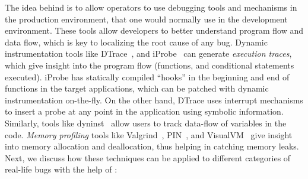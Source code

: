 The idea behind \parikshan is to allow operators to use debugging tools and mechanisms in the production environment, that one would normally use in the development environment.
These tools allow developers to better understand program flow and data flow, which is key to localizing the root cause of any bug.
Dynamic instrumentation tools like DTrace~\cite{dtrace}, and iProbe~\cite{iProbe} can generate \emph{execution traces}, which give insight into the program flow (functions, and conditional statements executed).
iProbe has statically compiled ``hooks'' in the beginning and end of functions in the target applications, which can be patched with dynamic instrumentation on-the-fly.
On the other hand, DTrace uses interrupt mechanisms to insert a probe at any point in the application using symbolic information. 
Similarly, tools like dyninst~\cite{dyninst} allow users to track data-flow of variables in the code.
\emph{Memory profiling} tools like Valgrind~\cite{valgrind}, PIN~\cite{pin}, and VisualVM~\cite{visualvm} give insight into memory allocation and deallocation, thus helping in catching memory leaks.
Next, we discuss how these techniques can be applied to different categories of real-life bugs with the help of \parikshan:


